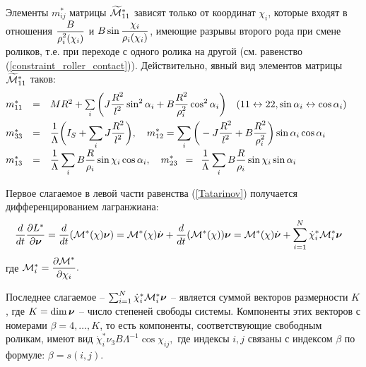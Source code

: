 Элементы $m^*_{ij}$ матрицы $\widetilde{\mathcal{M}}^*_{11}$ зависят только от координат $\chi_i$, которые входят в отношения $\displaystyle\frac{\displaystyle B}{\displaystyle \rho_i^2(\chi_i)}$ и $B\sin\displaystyle\frac{\displaystyle \chi_i}{\displaystyle \rho_i(\chi_i)}$, имеющие разрывы второго рода при смене роликов, т.е. при переходе с одного ролика на другой (см. равенство (\ref{constraint_roller_contact})). Действительно, явный вид элементов матрицы $\widetilde{\mathcal{M}}^*_{11}$ таков:
\begin{equation}\label{mstar}
    \hspace{-15pt}
    \begin{array}{rcl}
        m^*_{11} & = & MR^2 + \sum\limits_i \bigg( J\ddfrac{R^2}{l^2}\sin^2\alpha_i + B\ddfrac{R^2}{\rho_i^2}\cos^2\alpha_i\bigg)\quad(11 \leftrightarrow 22, \sin\alpha_i \leftrightarrow \cos\alpha_i)\vsp
        m^*_{33} & = & \ddfrac{1}{\Lambda}\bigg(I_S + \sum\limits_i J\ddfrac{R^2}{l^2}\bigg),\quad
        m^*_{12}  =  \sum\limits_i \bigg(-J\ddfrac{R^2}{l^2} + B\ddfrac{R^2}{\rho_i^2}\bigg)\sin\alpha_i\cos\alpha_i\vsp
        m^*_{13} & = & \ddfrac{1}{\Lambda}\sum\limits_i B\ddfrac{R}{\rho_i}\sin\chi_i\cos\alpha_i,
        \quad
        m^*_{23} \enspace = \enspace \ddfrac{1}{\Lambda}\sum\limits_i B\ddfrac{R}{\rho_i}\sin\chi_i\sin\alpha_i
    \end{array}
\end{equation}

Первое слагаемое в левой части равенства (\ref{Tatarinov}) получается дифференцированием лагранжиана:
\begin{equation}\label{DLStarDnuDdt}
    \hspace{-10pt}
    \frac{d}{dt}\frac{\partial L^{*}}{\partial \vnu} = \frac{d}{dt}(\M^*(\chi)\vnu) = 
    \M^*(\chi)\dot{\vnu} +
    \frac{d}{dt}(\M^*(\chi))\vnu =
    \M^*(\chi)\dot{\vnu} +
    \sum_{i=1}^{N}\dot{\chi}_i^*\M^*_i\vnu
\end{equation}
где $\mathcal{M}^*_i = \displaystyle\frac{\displaystyle \partial \mathcal{M}^*}{\displaystyle \partial \chi_i}.$

Последнее слагаемое -- $\sum_{i=1}^{N}\dot{\chi}_i^*\mathcal{M}^*_i\boldsymbol{\mathbf{\nu}}$ -- является суммой векторов размерности $K$, где $K = \dim\boldsymbol{\mathbf{\nu}}$ -- число степеней свободы системы. Компоненты этих векторов с номерами $\beta = 4,\dots, K$, то есть компоненты, соответствующие свободным роликам, имеют вид $\dot{\chi}_i^*\nu_3B\Lambda^{-1}\cos\chi_{ij},$ где индексы $i,j$ связаны с индексом $\beta$ по формуле: $\beta = s(i, j)$.

